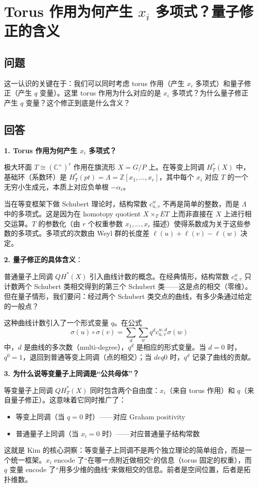 \section{Torus 作用为何产生 $x_i$ 多项式？量子修正的含义}\label{sec:torus-x-and-quantum-correction}
\subsection{问题}
这一认识的关键在于：我们可以同时考虑 torus 作用（产生 $x_i$ 多项式）和量子修正（产生 $q$ 变量）。这里 torus 作用为什么对应的是 $x_i$ 多项式？为什么量子修正产生 $q$ 变量？这个修正到底是什么含义？

\subsection{回答}
\textbf{1. Torus 作用为何产生 $x_i$ 多项式？}

极大环面 $T \cong (\mathbb{C}^\times)^r$ 作用在旗流形 $X = G/P$ 上。在等变上同调 $H_T^*(X)$ 中，基础环（系数环）是 $H_T^*(pt) = \Lambda = \mathbb{Z}[x_1, \ldots, x_r]$，其中每个 $x_i$ 对应 $T$ 的一个无穷小生成元，本质上对应负单根 $-\alpha_i$。

当在等变框架下做 Schubert 理论时，结构常数 $c_{u,v}^w$ 不再是简单的整数，而是 $\Lambda$ 中的多项式。这是因为在 homotopy quotient $X \times_T ET$ 上而非直接在 $X$ 上进行相交运算。$T$ 的参数化（由 $r$ 个权重参数 $x_1, \ldots, x_r$ 描述）使得系数成为关于这些参数的多项式。多项式的次数由 Weyl 群的长度差 $\ell(u) + \ell(v) - \ell(w)$ 决定。

\textbf{2. 量子修正的具体含义}：

普通量子上同调 $QH^*(X)$ 引入曲线计数的概念。在经典情形，结构常数 $c_{u,v}^w$ 只计数两个 Schubert 类相交得到的第三个 Schubert 类——这是点的相交（零维）。但在量子情形，我们要问：经过两个 Schubert 类交点的曲线，有多少条通过给定的一般点？

这种曲线计数引入了一个形式变量 $q$。在公式
$$\sigma(u) \circ \sigma(v) = \sum_{d} \sum_{w} q^d c_{u,v}^{w,d} \sigma(w)$$
中，$d$ 是曲线的多次数（multi-degree），$q^d$ 是相应的形式变量。当 $d = 0$ 时，$q^0 = 1$，退回到普通等变上同调（点的相交）；当 $d eq 0$ 时，$q^d$ 记录了曲线的贡献。

\textbf{3. 为什么说等变量子上同调是``公共母体''？}

等变量子上同调 $QH_T^*(X)$ 同时包含两个自由度：$x_i$（来自 torus 作用）和 $q$（来自量子修正）。这意味着它同时推广了：
\begin{itemize}
\item 等变上同调（当 $q = 0$ 时）——对应 Graham positivity
\item 普通量子上同调（当 $x_i = 0$ 时）——对应普通量子结构常数
\end{itemize}
这就是 Kim 的核心洞察：等变量子上同调不是两个独立理论的简单组合，而是一个统一框架。$x_i$ encode 了``在哪一点附近做相交``的信息（torus 固定的权重），而 $q$ 变量 encode 了``用多少维的曲线``来做相交的信息。前者是空间位置，后者是拓扑维数。
